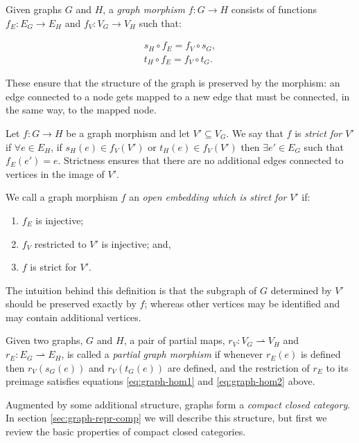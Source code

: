 \documentclass[runningheads]{llncs}
\begin{document}
Given graphs $G$ and $H$, a \emph{graph morphism} $f : G\to H$
consists of functions $f_E : E_G \to E_H$ and $f_V:V_G\to V_H$ such
that:

\begin{gather}
  s_H\circ f_E = f_V \circ s_G,\label{eq:graph-hom1}\\
  t_H\circ f_E = f_V \circ t_G\label{eq:graph-hom2}.
\end{gather}

\noindent These ensure that the structure of the graph is preserved by
the morphism: an edge connected to a node gets mapped to a new edge
that must be connected, in the same way, to the mapped node.

Let $f: G \to H$ be a graph morphism and let $V' \subseteq V_G$. We say
that $f$ is \emph{strict for $V'$} if $\forall e \in E_H$, if $s_H(e)
\in f_V(V')$ or $t_H(e) \in f_V(V')$ then $\exists e' \in E_G$ such
that $f_E(e') = e$. Strictness ensures that there are no additional
edges connected to vertices in the image of $V'$.

\begin{definition}
\label{open-embedding-def}
We call a graph morphism $f$ an \emph{open embedding which is stirct for} $V'$ if:
\begin{enumerate}
\item $f_E$ is injective;
\item $f_V$ restricted to $V'$ is injective; and,
\item $f$ is strict for $V'$.
\end{enumerate}
\end{definition}

\noindent The intuition behind this definition is that the subgraph of
$G$ determined by $V'$ should be preserved exactly by $f$; 
whereas other vertices may be identified and may contain additional
vertices.

Given two graphs, $G$ and $H$, a pair of partial maps, $r_V: V_G
\rightharpoonup V_H$ and $r_E: E_G \rightharpoonup E_H$, is called a
\emph{partial graph morphism} if whenever $r_E(e)$ is defined then
$r_V(s_G(e))$ and $r_V(t_G(e))$ are defined, and the restriction of
$r_E$ to its preimage satisfies equations \eqref{eq:graph-hom1} and
\eqref{eq:graph-hom2} above.

Augmented by some additional structure, graphs form a \emph{compact closed
category}.  In section \ref{sec:graph-repr-comp} we will describe this
structure, but first we review the basic properties of compact closed
categories.
\end{document}

